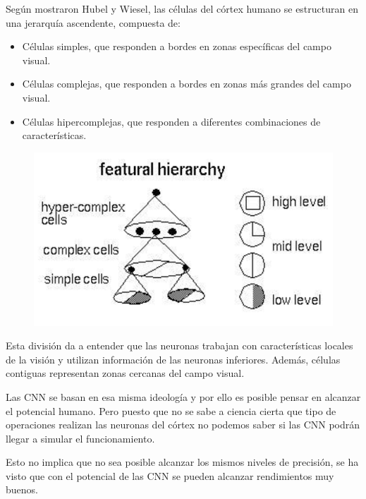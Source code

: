 \documentclass[11pt]{scrartcl} %
\begin{document}

Según mostraron Hubel y Wiesel, las células del córtex humano se estructuran en 
una jerarquía ascendente, compuesta de:
\begin{itemize}
	\item Células simples, que responden a bordes en zonas específicas del campo visual.
	\item Células complejas, que responden a bordes en zonas más grandes del campo visual.
	\item Células hipercomplejas, que responden a diferentes combinaciones de 
	características.
\end{itemize}

\begin{figure}[h]
	\centering
	\includegraphics[width=1.0\columnwidth]{1.png}
\end{figure}

Esta división da a entender que las neuronas trabajan con características
locales de la visión y utilizan información de las neuronas inferiores.
Además, células contiguas representan zonas cercanas del campo visual. \newline

Las CNN se basan en esa misma ideología y por ello es posible pensar en alcanzar
el potencial humano. 
Pero puesto que no se sabe a ciencia cierta que tipo de operaciones realizan
las neuronas del córtex no podemos saber si las CNN podrán llegar a simular el 
funcionamiento. \newline

Esto no implica que no sea posible alcanzar los mismos niveles de precisión, se
ha visto que con el potencial de las CNN se pueden alcanzar rendimientos muy buenos.
\end{document}

